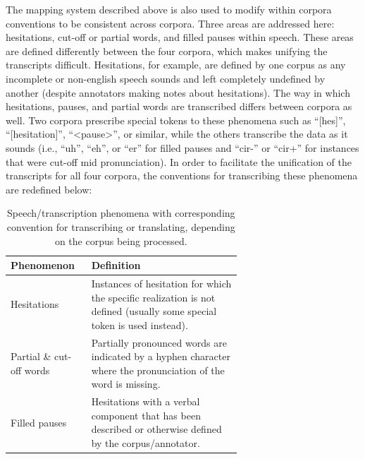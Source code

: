 \documentclass[12pt]{article}
\begin{document}
The mapping system described above is also used to modify within corpora conventions to be consistent across corpora. Three areas are addressed here:
hesitations, cut-off or partial words, and filled pauses within speech. These areas are defined differently between the four corpora, which makes
unifying the transcripts difficult. Hesitations, for example, are defined by one corpus as any incomplete or non-english speech sounds and left
completely undefined by another (despite annotators making notes about hesitations). The way in which hesitations, pauses, and partial words are
transcribed differs between corpora as well. Two corpora prescribe special tokens to these phenomena such as ``[hes]'', ``[hesitation]'', ``<pause>'',
or similar, while the others transcribe the data as it sounds (i.e., ``uh'', ``eh'', or ``er'' for filled pauses and ``cir-'' or ``cir+'' for
instances that were cut-off mid pronunciation). In order to facilitate the unification of the transcripts for all four corpora, the conventions for
transcribing these phenomena are redefined below:

\begin{table}[!t]
    \centering
    \begin{tabular}{l p{0.65\linewidth}}
        \toprule
        Phenomenon               & Definition                                                                                                              \\
        \midrule
        Hesitations              & Instances of hesitation for which the specific realization is not defined (usually some special token is used instead). \\
        \midrule
        Partial \& cut-off words & Partially pronounced words are indicated by a hyphen character where the pronunciation of the word is missing.          \\
        \midrule
        Filled pauses            & Hesitations with a verbal component that has been described or otherwise defined by the corpus/annotator.               \\
        \bottomrule
    \end{tabular}
    \caption{Speech/transcription phenomena with corresponding convention for transcribing or translating, depending on the corpus being processed.}
    \label{tab:phenomena_definitions}
\end{table}
\end{document}
